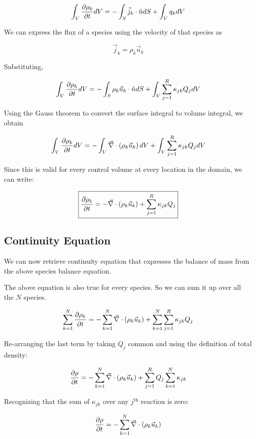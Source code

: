 $$ \int_{V}{ {\partial \rho_k \over \partial t} dV} = - \int_{S}{ \vec{j}_k
\cdot
\hat{n} dS} + \int_{V}{q_k dV} $$

We can express the flux of a species using the velocity of that species as

$$\vec{j}_k = \rho_k \vec{u}_k$$

Substituting,

$$ \int_{V}{ {\partial \rho_k \over \partial t} dV} = - \int_{S}{ \rho_k
\vec{u}_k \cdot \hat{n} dS} + \int_{V}{\sum_{j=1}^{R}{\kappa_{jk}Q_j} dV} $$

Using the Gauss theorem to convert the surface integral to volume integral, we
obtain

$$ \int_{V}{ {\partial \rho_k \over \partial t} dV} = - \int_{V}{ \vec{\nabla} \cdot
\left(\rho_k \vec{u}_k \right) dV} + \int_{V}{\sum_{j=1}^{R}{\kappa_{jk}Q_j} dV}
$$

Since this is valid for every control volume at every location in the domain, we
can write:

\begin{equation}
\label{rhokuk1}
\boxed{
 {\partial \rho_k \over \partial t}  = - { \vec{\nabla} \cdot \left(\rho_k \vec{u}_k
\right) } + \sum_{j=1}^{R}{\kappa_{jk}Q_j}
}
\end{equation}

\subsection{Continuity Equation}
 
We can now retrieve continuity equation that expresses the balance of mass from
the above species balance equation.


The above equation is also true for every species. So we can sum it up over all
the $N$ species.

$$ \sum_{k=1}^{N}{\partial \rho_k \over \partial t}  = - \sum_{k=1}^{N}{ \vec{\nabla}
\cdot \left(\rho_k \vec{u}_k \right) } +
\sum_{k=1}^{N}{\sum_{j=1}^{R}{\kappa_{jk}Q_j} } $$

Re-arranging the last term by taking $Q_j$ common and using the definition of
total density:

$$ {\partial \rho \over \partial t}  = - \sum_{k=1}^{N}{ \vec{\nabla} \cdot
\left(\rho_k \vec{u}_k \right) } + \sum_{j=1}^{R} {Q_j
\sum_{k=1}^{N}{\kappa_{jk} } } $$

Recognizing that the sum of $\kappa_{jk}$ over any $j^\text{th}$ reaction is
zero:

$$ {\partial \rho \over \partial t}  = - \sum_{k=1}^{N}{ \vec{\nabla} \cdot
\left(\rho_k \vec{u}_k \right) } $$

